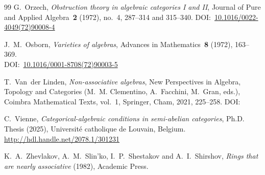 \documentclass[reqno,a4paper]{amsart}
\renewcommand{\doi}[1]{DOI:~\href{https://doi.org/#1}{#1}}
\theoremstyle{plain}
\theoremstyle{definition}
\theoremstyle{remark}
\numberwithin{equation}{section}
\begin{document}
\begin{thebibliography}{99}
G.~Orzech, \emph{Obstruction theory in algebraic categories {I} and {II}}, Journal of Pure and Applied Algebra~\textbf{2} (1972), no.~4, 287--314 and 315--340. \doi{10.1016/0022-4049(72)90008-4}

J.~M.~Osborn, \emph{Varieties of algebras}, Advances in Mathematics~\textbf{8} (1972), 163--369.\\ \doi{10.1016/0001-8708(72)90003-5}

T.~Van~der Linden, \emph{Non-associative algebras}, New Perspectives in Algebra, Topology and Categories (M.~M. Clementino, A.~Facchini, M.~Gran, eds.), Coimbra Mathematical Texts, vol.~1, Springer, Cham, 2021, 225--258. \doi{}

C.~Vienne, \emph{Categorical-algebraic conditions in semi-abelian categories}, Ph.D. Thesis (2025), Université catholique de Louvain, Belgium. \url{http://hdl.handle.net/2078.1/301231}

K.~A.~Zhevlakov, A.~M.~Slin’ko, I.~P.~Shestakov and A.~I.~Shirshov, \emph{Rings that are nearly associative} (1982), Academic Press. 

\end{thebibliography}
\end{document}

